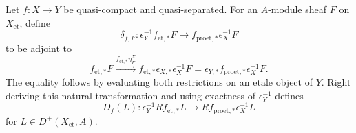 \begin{definition}
\label{def:weil-pbc-epsilon-direct-image-comparison}
Let $f:X\to Y$ be quasi-compact and quasi-separated.  For an $A$-module
sheaf $F$ on $X_{\mathrm{et}}$, define
\[
 \delta_{f,F}:\epsilon_Y^{-1}f_{\mathrm{et},*}F
 \longrightarrow f_{\mathrm{proet},*}\epsilon_X^{-1}F
\]
to be adjoint to
\[
 f_{\mathrm{et},*}F\xrightarrow{f_{\mathrm{et},*}\eta^X_F}
 f_{\mathrm{et},*}\epsilon_{X,*}\epsilon_X^{-1}F
 =\epsilon_{Y,*}f_{\mathrm{proet},*}\epsilon_X^{-1}F.
\]
The equality follows by evaluating both restrictions on an etale object of
$Y$.  Right deriving this natural transformation and using exactness of
$\epsilon_Y^{-1}$ defines
\[
 D_f(L):\epsilon_Y^{-1}Rf_{\mathrm{et},*}L
 \longrightarrow Rf_{\mathrm{proet},*}\epsilon_X^{-1}L
\]
for $L\in D^+(X_{\mathrm{et}},A)$.
\end{definition}


